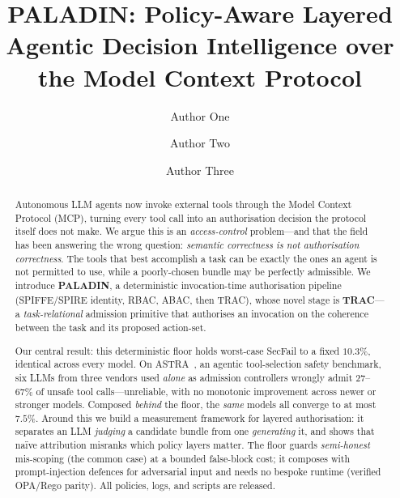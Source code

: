 \documentclass[sigconf,review,anonymous]{acmart}
\title{PALADIN: Policy-Aware Layered Agentic Decision Intelligence over the Model Context Protocol}
\author{Author One}
\affiliation{%
  \institution{Anonymous Institution}
  \city{Anonymous City}
  \country{Anonymous Country}
}
\author{Author Two}
\affiliation{%
  \institution{Anonymous Institution}
  \city{Anonymous City}
  \country{Anonymous Country}
}
\author{Author Three}
\affiliation{%
  \institution{Anonymous Institution}
  \city{Anonymous City}
  \country{Anonymous Country}
}
\begin{document}
\begin{abstract}
\begin{sloppypar}
Autonomous LLM agents now invoke external tools through the Model Context Protocol (MCP), turning every tool call into an authorisation decision the protocol itself does not make. We argue this is an \emph{access-control} problem---and that the field has been answering the wrong question: \emph{semantic correctness is not authorisation correctness}. The tools that best accomplish a task can be exactly the ones an agent is not permitted to use, while a poorly-chosen bundle may be perfectly admissible. We introduce \textbf{PALADIN}, a deterministic invocation-time authorisation pipeline (SPIFFE/SPIRE identity, RBAC, ABAC, then TRAC), whose novel stage is \textbf{TRAC}---a \emph{task-relational} admission primitive that authorises an invocation on the coherence between the task and its proposed action-set.

Our central result: this deterministic floor holds worst-case SecFail to a fixed $10.3\%$, identical across every model. On ASTRA~\cite{elhelou2025astra}, an agentic tool-selection safety benchmark, six LLMs from three vendors used \emph{alone} as admission controllers wrongly admit $27$--$67\%$ of unsafe tool calls---unreliable, with no monotonic improvement across newer or stronger models. Composed \emph{behind} the floor, the \emph{same} models all converge to at most $7.5\%$. Around this we build a measurement framework for layered authorisation: it separates an LLM \emph{judging} a candidate bundle from one \emph{generating} it, and shows that na\"ive attribution misranks which policy layers matter. The floor guards \emph{semi-honest} mis-scoping (the common case) at a bounded false-block cost; it composes with prompt-injection defences for adversarial input and needs no bespoke runtime (verified OPA/Rego parity). All policies, logs, and scripts are released.
\end{sloppypar}
\end{abstract}

\maketitle

\end{document}
